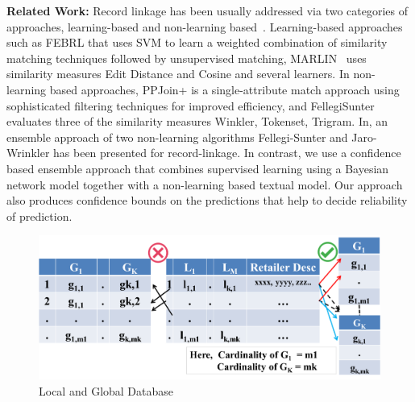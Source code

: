 \textbf{Related Work:} Record linkage has been usually addressed via two categories of approaches, learning-based and non-learning based~\cite{kopcke2010evaluation}. Learning-based approaches such as FEBRL\cite{christen2008febrl} that uses SVM to learn a weighted combination
of similarity matching techniques followed by unsupervised matching, MARLIN~\cite{bilenko2003adaptive} uses similarity measures Edit Distance and Cosine and several learners. In non-learning based approaches, PPJoin+\cite{xiao2011efficient} is a single-attribute match approach using sophisticated filtering techniques for improved efficiency, and FellegiSunter\cite{fellegi1969theory} evaluates three of the similarity measures Winkler, Tokenset, Trigram. In\cite{poon2016ensemble}, an ensemble approach of two non-learning algorithms Fellegi-Sunter and Jaro-Wrinkler has been presented for record-linkage. In contrast, we use a confidence based ensemble approach that combines supervised learning using a Bayesian network model together with a non-learning based textual model.
Our approach also produces confidence bounds on the predictions that help to decide reliability of prediction.

\begin{figure}
\centering
\includegraphics[width=120mm]{Figures/Prob-combine}
\caption{Local and Global Database}
\label{fig:Prob1}
\end{figure}





